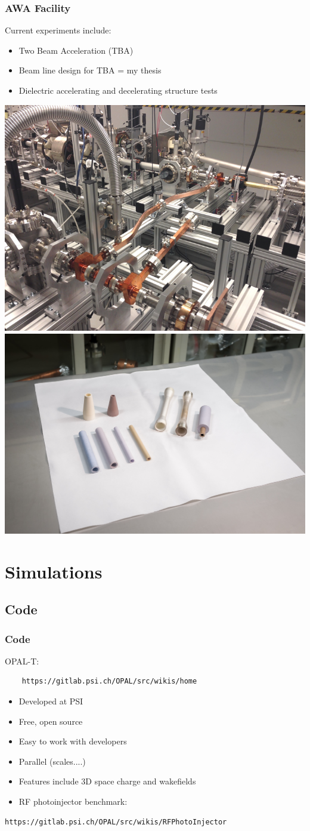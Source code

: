 \documentclass[professionalfonts,t]{beamer}
\begin{document}
\begin{frame}[t]
	\frametitle{AWA Facility}
	Current experiments include:
	\begin{itemize}
		\item{Two Beam Acceleration (TBA)}
		\item{Beam line design for TBA = my thesis}
		\item{Dielectric accelerating and decelerating structure tests}	
	\end{itemize}
    \vspace{1em}
	\includegraphics[width=0.5\linewidth, trim={0 0 0 1.65cm},clip]{../images/stage}\hfill%
	\includegraphics[width=0.5\linewidth]{../images/dielectrics}	
\end{frame}
\section{Simulations}
\subsection{Code}
\begin{frame}[containsverbatim]
\frametitle{Code}
OPAL-T: \begin{verbatim}
	https://gitlab.psi.ch/OPAL/src/wikis/home
\end{verbatim}
\begin{itemize}
\item Developed at PSI
\item Free, open source 
\item Easy to work with developers
\item Parallel (scales....)
\item Features include 3D space charge and wakefields
\item RF photoinjector benchmark:
\end{itemize}
\begin{verbatim}
https://gitlab.psi.ch/OPAL/src/wikis/RFPhotoInjector
\end{verbatim}
\end{frame}
\end{document}

